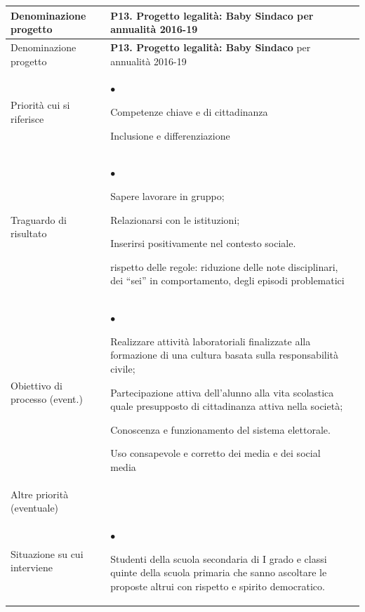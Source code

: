 \documentclass[12pt,a4paper,oneside]{memoir}
\newenvironment{elenco}{\begin{list}{$\bullet$}{%
              \setlength{\leftmargin}{4mm}%
              \setlength{\rightmargin}{1mm}%
               \setlength{\itemindent}{0mm}%
               \setlength{\labelwidth}{2mm}%
               \setlength{\labelsep}{2mm}%
              \setlength{\itemsep}{-\parsep}%
              \setlength{\partopsep}{0pt}%
              \setlength{\topsep}{0pt}%
             \setlength{\parskip}{0pt}%
              }}{\end{list}}
\begin{document}
\vspace{24pt}

\begin{footnotesize}
\begin{longtable}{|>{\raggedright}p{2.5cm}|>{\raggedright\arraybackslash}P{10cm}|}
\hline
{}
\label{P13}Denominazione progetto&\textbf{P13. Progetto legalità: Baby Sindaco} per annualità 2016-19\\ \hline \endfirsthead
\hline
{}
Denominazione progetto&\textbf{P13. Progetto legalità: Baby Sindaco} per annualità 2016-19\\ \hline \endhead
{}
\endfoot
\hline
\endlastfoot
Priorità cui si riferisce&\begin{elenco}
\item Competenze chiave e di cittadinanza
\item Inclusione e differenziazione
\end{elenco}\\[-4mm] \hline
Traguardo di risultato&
\begin{elenco}
\item Sapere lavorare in gruppo; 
\item Relazionarsi con le istituzioni;
\item Inserirsi positivamente nel contesto sociale.
\item rispetto delle regole: riduzione delle note disciplinari, dei ``sei'' in comportamento, degli episodi problematici
\end{elenco}\\[-4mm] \hline
Obiettivo di processo (event.)&
\begin{elenco}
\item Realizzare attività laboratoriali finalizzate alla formazione di una cultura basata sulla responsabilità civile;
\item Partecipazione attiva dell'alunno alla vita scolastica quale presupposto di cittadinanza attiva nella società;
\item Conoscenza e funzionamento del sistema elettorale.
\item Uso consapevole e corretto dei media e dei social media
\end{elenco}\\[-4mm] \hline
Altre priorità (eventuale)&\\ \hline
Situazione su cui interviene&\begin{elenco}
\item Studenti della scuola secondaria di I grado e classi quinte della scuola primaria che sanno ascoltare le proposte altrui con rispetto e spirito democratico.

\end{elenco}
\end{longtable}
\end{footnotesize}
\end{document}
